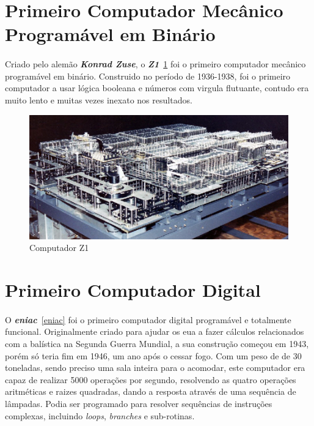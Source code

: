 \documentclass{report}
\begin{document}
\section{Primeiro Computador Mecânico Programável em Binário}
\paragraph{}
Criado pelo alemão \textbf{\textit{Konrad Zuse}}, o \textbf{\textit{Z1}}~\ref{z1} \cite{Z1} foi o primeiro computador mecânico programável em binário. Construido no período de 1936-1938, foi o primeiro computador a usar lógica booleana e números com virgula flutuante, contudo era muito lento e muitas vezes inexato nos resultados.

\begin{figure}[H]
\centering
\includegraphics[width=0.7\linewidth]{Z1.jpg}
\caption{Computador Z1}
\label{z1}
\end{figure}

\section{Primeiro Computador Digital}
\paragraph{}
O \textbf{\textit{\acs{eniac}}}~\ref{eniac} \cite{ENIAC} foi o primeiro computador digital programável e totalmente funcional. Originalmente criado para ajudar os \acs{eua} a fazer cálculos relacionados com a balística na Segunda Guerra Mundial, a sua construção começou em 1943, porém só teria fim em 1946, um ano após o cessar fogo.
Com um peso de de 30 toneladas, sendo preciso uma sala inteira para o acomodar, este computador era capaz de realizar 5000 operações por segundo, resolvendo as quatro operações aritméticas e raizes quadradas, dando a resposta através de uma sequência de lâmpadas. Podia ser programado para resolver sequências de instruções complexas, incluindo \textit{loops}, \textit{branches} e sub-rotinas. 
\end{document}
